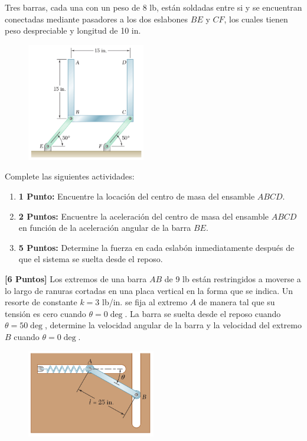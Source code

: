 \documentclass[ a4paper, twoside, 11pt]{article}
\begin{document}
\begin{problem}
Tres barras, cada una con un peso de 8 lb, est\'an soldadas entre si y se encuentran conectadas mediante pasadores a los dos eslabones $BE$ y $CF$, los cuales tienen peso despreciable y longitud de 10 in. 

\begin{figure}[htb]
\centering
\includegraphics[width=0.46\textwidth]{problema-02.jpg}
\end{figure}

Complete las siguientes actividades: 
\begin{enumerate}[label=\textbf{\alph*)}]
\item \textbf{1 Punto:} Encuentre la locaci\'on del centro de masa del ensamble $ABCD$. 
\item \textbf{2 Puntos:} Encuentre la aceleraci\'on del centro de masa del ensamble $ABCD$ en funci\'on de la aceleraci\'on angular de la barra $BE$. 
\item \textbf{5 Puntos:} Determine la fuerza en cada eslab\'on inmediatamente despu\'es de que el sistema se suelta desde el reposo. 
\end{enumerate}

\end{problem}
\fullskip

\begin{problem}
\textbf{[6 Puntos]} Los extremos de una barra $AB$ de 9 lb est\'an restringidos a moverse a lo largo de ranuras cortadas en una placa vertical en la forma que se indica. Un resorte de constante $k = 3$ lb/in. se fija al extremo $A$ de manera tal que su tensi\'on es cero cuando $\theta = 0\deg$. La barra se suelta desde el reposo cuando $\theta = 50\deg$, determine la velocidad angular de la barra y la velocidad del extremo $B$ cuando $\theta = 0\deg$. 

\begin{figure}[htb]
\centering
\includegraphics[width=0.5\textwidth]{problema-03.jpg}
\end{figure}

\end{problem}
\fullskip
\end{document}
